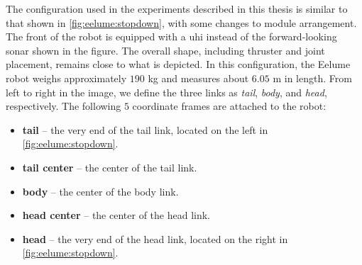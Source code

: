 The configuration used in the experiments described in this thesis is similar 
to that shown in \autoref{fig:eelume:stopdown}, with some changes to module 
arrangement. The front of the robot is equipped with a \gls{uhi} instead of 
the forward-looking sonar shown in the figure. The overall shape, including 
thruster and joint placement, remains close to what is depicted. In this 
configuration, the Eelume robot weighs approximately $190$ kg and measures 
about $6.05$ m in length. From left to right in the image, we define the three 
links as \textit{tail}, \textit{body}, and \textit{head}, respectively. The 
following $5$ coordinate frames are attached to the robot:
\begin{itemize}
\item \textbf{tail} – the very end of the tail link, located on the left in \autoref{fig:eelume:stopdown}.
\item \textbf{tail center} – the center of the tail link.
\item \textbf{body} – the center of the body link.
\item \textbf{head center} – the center of the head link.
\item \textbf{head} – the very end of the head link, located on the right in \autoref{fig:eelume:stopdown}.
\end{itemize}

